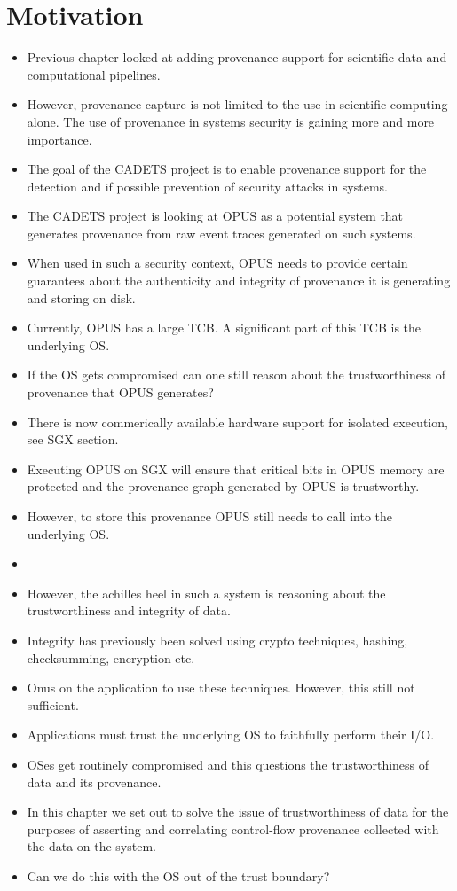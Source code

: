 \documentclass[withindex,glossary]{cam-thesis}
\begin{document}
\section{Motivation}
\begin{itemize}
\item Previous chapter looked at adding provenance support for scientific data and computational pipelines. 
\item However, provenance capture is not limited to the use in scientific computing alone. The use of provenance in systems security is gaining more and more importance.
\item The goal of the CADETS project is to enable provenance support for the detection and if possible prevention of security attacks in systems.
\item The CADETS project is looking at OPUS as a potential system that generates provenance from raw event traces generated on such systems.
\item When used in such a security context, OPUS needs to provide certain guarantees about the authenticity and integrity of provenance it is generating and storing on disk.
\item Currently, OPUS has a large TCB. A significant part of this TCB is the underlying OS.
\item If the OS gets compromised can one still reason about the trustworthiness of provenance that OPUS generates?

\item There is now commerically available hardware support for isolated execution, see SGX section.
\item Executing OPUS on SGX will ensure that critical bits in OPUS memory are protected and the provenance graph generated by OPUS is trustworthy.
\item However, to store this provenance OPUS still needs to call into the underlying OS.
\item  %

\item However, the achilles heel in such a system is reasoning about the trustworthiness and integrity of data.
\item Integrity has previously been solved using crypto techniques, hashing, checksumming, encryption etc.
\item Onus on the application to use these techniques. However, this still not sufficient.
\item Applications must trust the underlying OS to faithfully perform their I/O.
\item OSes get routinely compromised and this questions the trustworthiness of data and its provenance.
\item In this chapter we set out to solve the issue of trustworthiness of data for the purposes of asserting and correlating control-flow provenance collected with the data on the system.
\item Can we do this with the OS out of the trust boundary?
\end{itemize}
\end{document}
